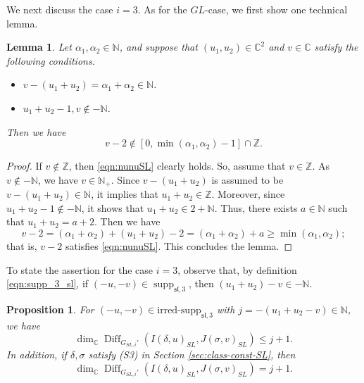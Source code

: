 \documentclass[a4paper,11pt,reqno]{amsart}
\newcommand{\0}{{\bf 0}}
\newcommand{\N}{\mathbb{N}}
\newcommand{\Z}{\mathbb{Z}}
\newcommand{\C}{\mathbb{C}}
\newcommand{\1}{{\bf 1}}
\newcommand{\irredsupp}{\mathrm{irred\text{-}supp}}
\DeclareMathOperator{\supp}{supp}
\DeclareMathOperator{\Diff}{Diff}
\newcommand{\fraksl}{{\mathfrak{sl}}}
\theoremstyle{plain}
\newtheorem{proposition}[equation]{Proposition}
\newtheorem{lemma}[equation]{Lemma}
\theoremstyle{definition}
\numberwithin{equation}{section}
\theoremstyle{definition}
\begin{document}
We next discuss the case $i=3$. 
As for the $GL$-case, we first show one technical lemma.

\begin{lemma}\label{lem:nunuSL}
Let $\alpha_1, \alpha_2 \in \N$,
and suppose that $(u_1,u_2)\in \C^2$ and $v \in \C$ satisfy the following conditions.

\begin{itemize}

\item $v-(u_1+u_2)=\alpha_1+\alpha_2 \in \N$.
\vskip 0.1in

\item $u_1+u_2-1, v \notin -\N$.
\vskip 0.1in
\end{itemize}
Then we have 
\begin{equation}\label{eqn:nunuSL}
v-2 \notin [0, \min(\alpha_1,\alpha_2)-1]\cap \Z.
\end{equation}

\end{lemma}

\begin{proof}
If $v \notin \Z$, then \eqref{eqn:nunuSL} clearly holds.
So, assume that $v \in \Z$. As $v \notin -\N$, we have
$v \in \N_+$. Since $v-(u_1+u_2)$ is assumed to be $v-(u_1+u_2) \in \N$,
it implies that $u_1+u_2 \in \Z$. Moreover, since $u_1+u_2-1 \notin -\N$,
it shows that $u_1+u_2\in 2+ \N$. Thus, there exists $a\in \N$ such that 
$u_1+u_2 = a + 2$.
Then we have 
\begin{equation*}
v-2 
= (\alpha_1+\alpha_2) + (u_1+u_2)-2
=(\alpha_1+\alpha_2) + a 
\geq \min(\alpha_1,\alpha_2);
\end{equation*}
that is, $v-2$ satisfies \eqref{eqn:nunuSL}.
This concludes the lemma.
\end{proof}

To state the assertion for the case $i=3$, observe that,
by definition \eqref{eqn:supp_3_sl}, 
if $(-u, -v) \in \supp_{\fraksl,3}$, then $(u_1+u_2)-v \in -\N$.

\begin{proposition}\label{prop:dim_Diff_SL3}
For $(-u, -v) \in \irredsupp_{\fraksl,3}$ with
$j=-(u_1+u_2-v)\in\N$, we have 
\begin{equation*}
\dim_\C\Diff_{G_{SL,i}'}(I(\delta, u)_{SL}, J(\sigma,v)_{SL}) \leq j+1.
\end{equation*}
In addition, if $\delta, \sigma$ satisfy (S3) in Section \ref{sec:class-const-SL}, then
\begin{equation*}
\dim_\C\Diff_{G_{SL,i}'}(I(\delta, u)_{SL}, J(\sigma,v)_{SL}) =j+1.
\end{equation*}
\end{proposition}
\end{document}
